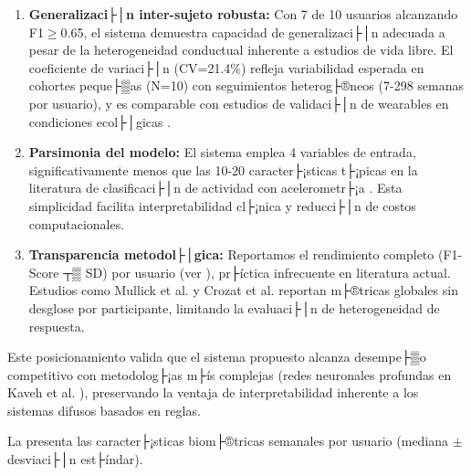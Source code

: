 \begin{enumerate}
    \item \textbf{Generalizaci├│n inter-sujeto robusta:} Con 7 de 10 usuarios alcanzando F1$\geq$0.65, el sistema demuestra capacidad de generalizaci├│n adecuada a pesar de la heterogeneidad conductual inherente a estudios de vida libre. El coeficiente de variaci├│n (CV=21.4\%) refleja variabilidad esperada en cohortes peque├▒as (N=10) con seguimientos heterog├®neos (7-298 semanas por usuario), y es comparable con estudios de validaci├│n de wearables en condiciones ecol├│gicas \cite{Doherty2021}.
    
    \item \textbf{Parsimonia del modelo:} El sistema emplea 4 variables de entrada, significativamente menos que las 10-20 caracter├¡sticas t├¡picas en la literatura de clasificaci├│n de actividad con acelerometr├¡a \cite{Alinia2020}. Esta simplicidad facilita interpretabilidad cl├¡nica y reducci├│n de costos computacionales.
    
    \item \textbf{Transparencia metodol├│gica:} Reportamos el rendimiento completo (F1-Score ┬▒ SD) por usuario (ver ), pr├íctica infrecuente en literatura actual. Estudios como Mullick et al. \cite{Mullick2022} y Crozat et al. \cite{Crozat2025} reportan m├®tricas globales sin desglose por participante, limitando la evaluaci├│n de heterogeneidad de respuesta.
\end{enumerate}

Este posicionamiento valida que el sistema propuesto alcanza desempe├▒o competitivo con metodolog├¡as m├ís complejas (redes neuronales profundas en Kaveh et al. \cite{Kaveh2024}), preservando la ventaja de interpretabilidad inherente a los sistemas difusos basados en reglas.

La  presenta las caracter├¡sticas biom├®tricas semanales por usuario (mediana $\pm$ desviaci├│n est├índar).

